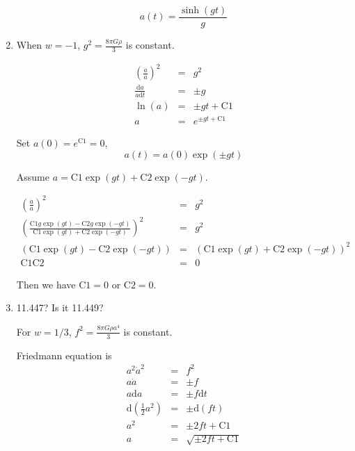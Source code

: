 \documentclass[12pt,a4paper]{article}
\begin{document}
\begin{enumerate}
\begin{equation*}
	a(t)=\frac{\sinh(gt)}{g}
\end{equation*}




\item

When $w=-1$, $g^2=\frac{8\pi G \rho}{3}$ is constant.

\begin{eqnarray*}
	\left( \frac{\dot a}{a} \right)^2 &=& g^2  \\
	\frac{\mathrm d a}{a\mathrm dt} &=& \pm g \\
	\ln( a) &=& \pm g t + \mathrm{C1} \\
	a &=& e^{\pm gt + \mathrm{C1}}
\end{eqnarray*}

Set $a(0)=e^{\mathrm{C1}}=0$,
\begin{equation*}
	a(t)=a(0)\exp(\pm gt)
\end{equation*}


Assume $a=\mathrm{C1}\exp(gt) + \mathrm{C2}\exp(-gt)$.

\begin{eqnarray*}
	(\frac{\dot a}{a})^2 &=& g^2  \\
	\left(\frac{\mathrm{C1}g \exp(gt) - \mathrm{C2} g \exp(-gt)}{\mathrm{C1} \exp(gt) + \mathrm{C2} \exp(-gt)}\right)^2 &=& g^2\\
	(\mathrm{C1} \exp(gt) - \mathrm{C2}  \exp(-gt))&=&(\mathrm{C1} \exp(gt) + \mathrm{C2} \exp(-gt))^2 \\
	\mathrm{C1}\mathrm{C2} &=& 0
\end{eqnarray*}

Then we have $\mathrm{C1}=0$ or $\mathrm{C2}=0$.


\item

{\color{red}11.447? Is it 11.449?}


For $w=1/3$, $f^2 = \frac{8\pi G \rho a^4}{3}$ is constant.

Friedmann equation is
\begin{eqnarray*}
	a^2\dot a^2 &=& f^2  \\
	a\dot a &=& \pm f \\
	a \mathrm da &=& \pm f \mathrm dt \\
	\mathrm d(\frac12 a^2) &=& \pm \mathrm d(ft) \\
	a^2 &=& \pm 2ft + \mathrm{C1} \\
	a &=& \sqrt {\pm 2ft + \mathrm{C1} }
\end{eqnarray*}



\end{enumerate}
\end{document}

